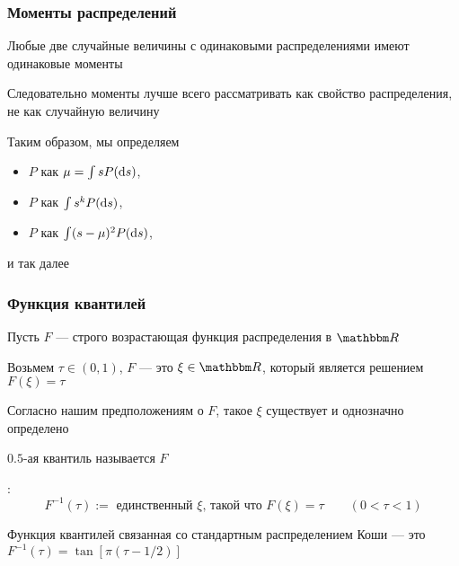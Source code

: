 \begin{frame}\frametitle{Моменты распределений}

    \vspace{2em}
    Любые две случайные величины с одинаковыми распределениями
    имеют одинаковые моменты
    
    Следовательно моменты лучше всего рассматривать как
    свойство распределения, не как случайную величину
    
    \vspace{.7em}
    Таким образом, мы определяем 
    \begin{itemize}
        \item {} $P$ как $\mu = \int s P(\mathop{}\!\mathrm{d} s)$,
        \item {} $P$ как $\int s^k P(\mathop{}\!\mathrm{d} s)$, 
        \item {} $P$ как $\int (s - \mu)^2 P(\mathop{}\!\mathrm{d} s)$,
    \end{itemize}
    и так далее

\end{frame}

\begin{frame}\frametitle{Функция квантилей}

    \vspace{2em}
    Пусть $F$ --- строго возрастающая функция распределения в $\RR$
    
    Возьмем $\tau \in (0, 1)$,  $F$ --- это $\xi \in \RR$, 
    который является решением $F(\xi) = \tau$
    
    Согласно нашим предположениям о $F$, такое $\xi$ существует и однозначно определено
    
    $0.5$-ая квантиль называется  $F$

\end{frame}

\begin{frame}

    \vspace{2em}
    :
    \begin{equation*}
        \label{eq:quantwi}
        F^{-1}(\tau) := \text{ единственный } \xi \text{, такой что } F(\xi) = \tau
        \qquad (0 < \tau < 1)
    \end{equation*}
    
    
    \vspace{.7em}
    \Eg
    Функция квантилей связанная со стандартным распределением Коши --- это
    $F^{-1}(\tau) = \tan [\pi(\tau - 1/2)]$

\end{frame}

